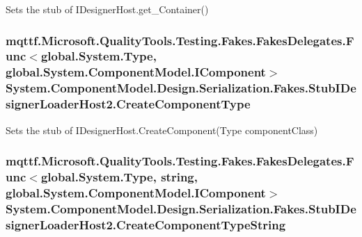 Sets the stub of I\-Designer\-Host.\-get\-\_\-\-Container()

\hypertarget{class_system_1_1_component_model_1_1_design_1_1_serialization_1_1_fakes_1_1_stub_i_designer_loader_host2_a9c73a8d48f89b56ec7a4c022da22a54e}{
\subsubsection[{Create\-Component\-Type}]{\setlength{\rightskip}{0pt plus 5cm}mqttf.\-Microsoft.\-Quality\-Tools.\-Testing.\-Fakes.\-Fakes\-Delegates.\-Func$<$global.\-System.\-Type, global.\-System.\-Component\-Model.\-I\-Component$>$ System.\-Component\-Model.\-Design.\-Serialization.\-Fakes.\-Stub\-I\-Designer\-Loader\-Host2.\-Create\-Component\-Type}}\label{class_system_1_1_component_model_1_1_design_1_1_serialization_1_1_fakes_1_1_stub_i_designer_loader_host2_a9c73a8d48f89b56ec7a4c022da22a54e}


Sets the stub of I\-Designer\-Host.\-Create\-Component(\-Type component\-Class)

\hypertarget{class_system_1_1_component_model_1_1_design_1_1_serialization_1_1_fakes_1_1_stub_i_designer_loader_host2_a052038ad4dcca65fedce85d918b1cdb8}{
\subsubsection[{Create\-Component\-Type\-String}]{\setlength{\rightskip}{0pt plus 5cm}mqttf.\-Microsoft.\-Quality\-Tools.\-Testing.\-Fakes.\-Fakes\-Delegates.\-Func$<$global.\-System.\-Type, string, global.\-System.\-Component\-Model.\-I\-Component$>$ System.\-Component\-Model.\-Design.\-Serialization.\-Fakes.\-Stub\-I\-Designer\-Loader\-Host2.\-Create\-Component\-Type\-String}}\label{class_system_1_1_component_model_1_1_design_1_1_serialization_1_1_fakes_1_1_stub_i_designer_loader_host2_a052038ad4dcca65fedce85d918b1cdb8}


